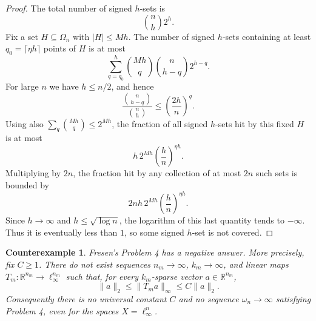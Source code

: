 \documentclass[11pt]{article}
\newtheorem*{theorem}{Counterexample}
\begin{document}
\begin{proof}
The total number of signed $h$-sets is
\[
  \binom{n}{h}2^h.
\]
Fix a set $H\subseteq\Omega_n$ with $|H|\leq Mh$.  The number of signed
$h$-sets containing at least $q_0=\lceil \eta h\rceil$ points of $H$ is at
most
\[
  \sum_{q=q_0}^h \binom{Mh}{q}\binom{n}{h-q}2^{h-q}.
\]
For large $n$ we have $h\leq n/2$, and hence
\[
  \frac{\binom{n}{h-q}}{\binom{n}{h}}
  \leq
  \left(\frac{2h}{n}\right)^q.
\]
Using also $\sum_q \binom{Mh}{q}\leq 2^{Mh}$, the fraction of all signed
$h$-sets hit by this fixed $H$ is at most
\[
  h\,2^{Mh}\left(\frac{h}{n}\right)^{\eta h}.
\]
Multiplying by $2n$, the fraction hit by any collection of at most $2n$ such
sets is bounded by
\[
  2nh\,2^{Mh}\left(\frac{h}{n}\right)^{\eta h}.
\]
Since $h\to\infty$ and $h\leq \sqrt{\log n}$, the logarithm of this last
quantity tends to $-\infty$.  Thus it is eventually less than $1$, so some
signed $h$-set is not covered.
\end{proof}

\begin{theorem}
Fresen's Problem 4 has a negative answer.  More precisely, fix $C\geq 1$.
There do not exist sequences $n_m\to\infty$, $k_m\to\infty$, and linear maps
$T_m:\mathbb R^{n_m}\to\ell_\infty^{n_m}$ such that, for every
$k_m$-sparse vector $a\in\mathbb R^{n_m}$,
\[
  \|a\|_2\leq \|T_m a\|_\infty\leq C\|a\|_2.
\]
Consequently there is no universal constant $C$ and no sequence
$\omega_n\to\infty$ satisfying Problem 4, even for the spaces
$X=\ell_\infty^n$.
\end{theorem}
\end{document}
